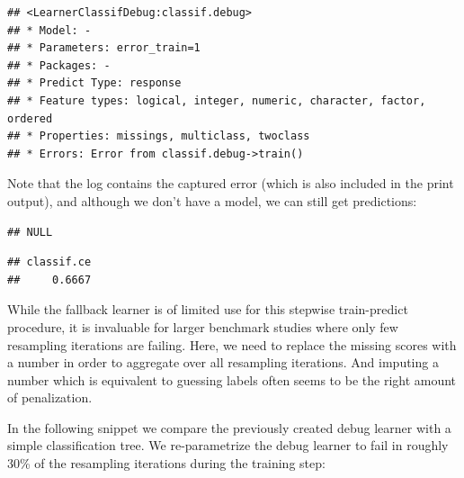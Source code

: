 \documentclass[
]{scrbook}
\newenvironment{Shaded}{\begin{snugshade}}{\end{snugshade}}
\newcommand{\FunctionTok}[1]{\textcolor[rgb]{0.00,0.00,0.00}{#1}}
\newcommand{\NormalTok}[1]{#1}
\newcommand{\OtherTok}[1]{\textcolor[rgb]{0.56,0.35,0.01}{#1}}
\newcommand{\SpecialCharTok}[1]{\textcolor[rgb]{0.00,0.00,0.00}{#1}}
\renewenvironment{Shaded} {\begin{snugshade}\small} {\end{snugshade}}
\begin{document}
\begin{verbatim}
## <LearnerClassifDebug:classif.debug>
## * Model: -
## * Parameters: error_train=1
## * Packages: -
## * Predict Type: response
## * Feature types: logical, integer, numeric, character, factor, ordered
## * Properties: missings, multiclass, twoclass
## * Errors: Error from classif.debug->train()
\end{verbatim}

Note that the log contains the captured error (which is also included in the print output), and although we don't have a model, we can still get predictions:

\begin{Shaded}
\end{Shaded}

\begin{verbatim}
## NULL
\end{verbatim}

\begin{Shaded}
\end{Shaded}

\begin{verbatim}
## classif.ce 
##     0.6667
\end{verbatim}

While the fallback learner is of limited use for this stepwise train-predict procedure, it is invaluable for larger benchmark studies where only few resampling iterations are failing.
Here, we need to replace the missing scores with a number in order to aggregate over all resampling iterations.
And imputing a number which is equivalent to guessing labels often seems to be the right amount of penalization.

In the following snippet we compare the previously created debug learner with a simple classification tree.
We re-parametrize the debug learner to fail in roughly 30\% of the resampling iterations during the training step:
\end{document}
